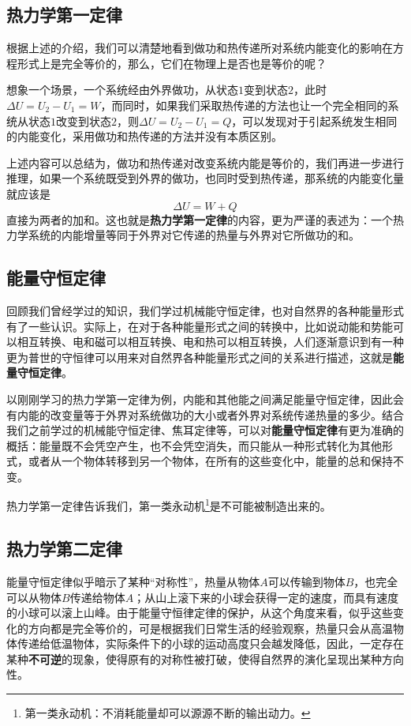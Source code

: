 \subsection{热力学第一定律}
根据上述的介绍，我们可以清楚地看到做功和热传递所对系统内能变化的影响在方程形式上是完全等价的，那么，它们在物理上是否也是等价的呢？

想象一个场景，一个系统经由外界做功，从状态$1$变到状态$2$，此时$\Delta U=U_2-U_1=W$，而同时，如果我们采取热传递的方法也让一个完全相同的系统从状态$1$改变到状态$2$，则$\Delta U=U_2-U_1=Q$，可以发现对于引起系统发生相同的内能变化，采用做功和热传递的方法并没有本质区别。

上述内容可以总结为，做功和热传递对改变系统内能是等价的，我们再进一步进行推理，如果一个系统既受到外界的做功，也同时受到热传递，那系统的内能变化量就应该是$$\Delta U=W+Q$$直接为两者的加和。这也就是\textbf{热力学第一定律}的内容，更为严谨的表述为：一个热力学系统的内能增量等同于外界对它传递的热量与外界对它所做功的和。

\subsection{能量守恒定律}
回顾我们曾经学过的知识，我们学过机械能守恒定律，也对自然界的各种能量形式有了一些认识。实际上，在对于各种能量形式之间的转换中，比如说动能和势能可以相互转换、电和磁可以相互转换、电和热可以相互转换，人们逐渐意识到有一种更为普世的守恒律可以用来对自然界各种能量形式之间的关系进行描述，这就是\textbf{能量守恒定律}。

以刚刚学习的热力学第一定律为例，内能和其他能之间满足能量守恒定律，因此会有内能的改变量等于外界对系统做功的大小或者外界对系统传递热量的多少。结合我们之前学过的机械能守恒定律、焦耳定律等，可以对\textbf{能量守恒定律}有更为准确的概括：能量既不会凭空产生，也不会凭空消失，而只能从一种形式转化为其他形式，或者从一个物体转移到另一个物体，在所有的这些变化中，能量的总和保持不变。

热力学第一定律告诉我们，第一类永动机\footnote{第一类永动机：不消耗能量却可以源源不断的输出动力。}是不可能被制造出来的。
\subsection{热力学第二定律}
能量守恒定律似乎暗示了某种“对称性”，热量从物体$A$可以传输到物体$B$，也完全可以从物体$B$传递给物体$A$；从山上滚下来的小球会获得一定的速度，而具有速度的小球可以滚上山峰。由于能量守恒律定律的保护，从这个角度来看，似乎这些变化的方向都是完全等价的，可是根据我们日常生活的经验观察，热量只会从高温物体传递给低温物体，实际条件下的小球的运动高度只会越发降低，因此，一定存在某种\textbf{不可逆}的现象，使得原有的对称性被打破，使得自然界的演化呈现出某种方向性。

